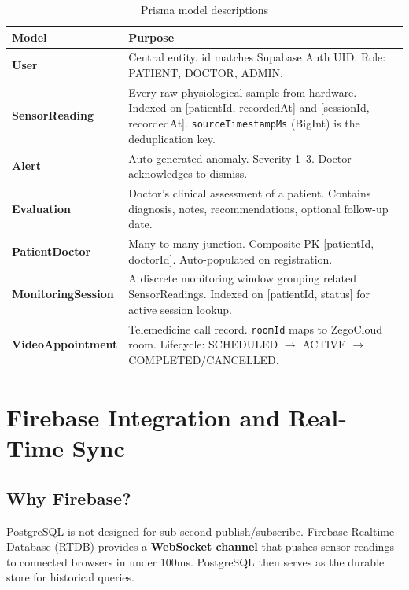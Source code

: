 \documentclass[12pt,a4paper]{report}
\begin{document}
\begin{table}[H]\centering\renewcommand{\arraystretch}{1.5}
\begin{tabularx}{\linewidth}{>{\bfseries}l X}
\toprule
Model & Purpose \\
\midrule
User & Central entity. id matches Supabase Auth UID. Role: PATIENT, DOCTOR, ADMIN. \\
SensorReading & Every raw physiological sample from hardware. Indexed on [patientId, recordedAt] and [sessionId, recordedAt]. \texttt{sourceTimestampMs} (BigInt) is the deduplication key. \\
Alert & Auto-generated anomaly. Severity 1--3. Doctor acknowledges to dismiss. \\
Evaluation & Doctor's clinical assessment of a patient. Contains diagnosis, notes, recommendations, optional follow-up date. \\
PatientDoctor & Many-to-many junction. Composite PK [patientId, doctorId]. Auto-populated on registration. \\
MonitoringSession & A discrete monitoring window grouping related SensorReadings. Indexed on [patientId, status] for active session lookup. \\
VideoAppointment & Telemedicine call record. \texttt{roomId} maps to ZegoCloud room. Lifecycle: SCHEDULED $\to$ ACTIVE $\to$ COMPLETED/CANCELLED. \\
\bottomrule
\end{tabularx}
\caption{Prisma model descriptions}
\end{table}

\chapter{Firebase Integration and Real-Time Sync}

\section{Why Firebase?}

PostgreSQL is not designed for sub-second publish/subscribe. Firebase Realtime Database (RTDB) provides a \textbf{WebSocket channel} that pushes sensor readings to connected browsers in under 100ms. PostgreSQL then serves as the durable store for historical queries.
\end{document}
